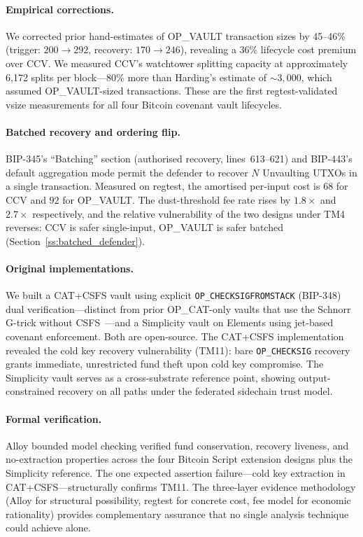 \paragraph{Empirical corrections.}
We corrected prior hand-estimates of OP\_VAULT transaction sizes by 45--46\%
(trigger: $200 \rightarrow 292$\vB{}, recovery: $170 \rightarrow 246$\vB{}),
revealing a 36\% lifecycle cost premium over CCV. We measured CCV's watchtower
splitting capacity at approximately 6{,}172 splits per block---80\% more than
Harding's estimate of ${\sim}3{,}000$, which assumed OP\_VAULT-sized transactions.
These are the first regtest-validated vsize measurements for all four Bitcoin
covenant vault lifecycles.

\paragraph{Batched recovery and ordering flip.}
BIP-345's ``Batching'' section (authorised recovery, lines~613--621)
and BIP-443's default aggregation mode permit the defender to recover
$N$ Unvaulting UTXOs in a single transaction. Measured on regtest, the
amortised per-input cost is $68$\vB{} for CCV and $92$\vB{} for
OP\_VAULT. The dust-threshold fee rate rises by $1.8\times$ and
$2.7\times$ respectively, and the relative vulnerability of the two
designs under TM4 reverses: CCV is safer single-input, OP\_VAULT is
safer batched (Section~\ref{ss:batched_defender}).

\paragraph{Original implementations.}
We built a CAT+CSFS vault using explicit \texttt{OP\_CHECKSIGFROMSTACK}
(BIP-348) dual verification---distinct from prior OP\_CAT-only vaults
that use the Schnorr G-trick without CSFS~\cite{Poe21, Rij24}---and a
Simplicity vault on Elements using jet-based covenant enforcement.
Both are open-source. The CAT+CSFS implementation revealed the cold
key recovery vulnerability (TM11): bare \texttt{OP\_CHECKSIG} recovery
grants immediate, unrestricted fund theft upon cold key compromise.
The Simplicity vault serves as a cross-substrate reference point,
showing output-constrained recovery on all paths under the federated
sidechain trust model.

\paragraph{Formal verification.}
Alloy bounded model checking verified fund conservation, recovery
liveness, and no-extraction properties across the four Bitcoin Script
extension designs plus the Simplicity reference. The one expected
assertion failure---cold key extraction in CAT+CSFS---structurally
confirms TM11. The three-layer evidence methodology (Alloy for
structural possibility, regtest for concrete cost, fee model for
economic rationality) provides complementary assurance that no single
analysis technique could achieve alone.

